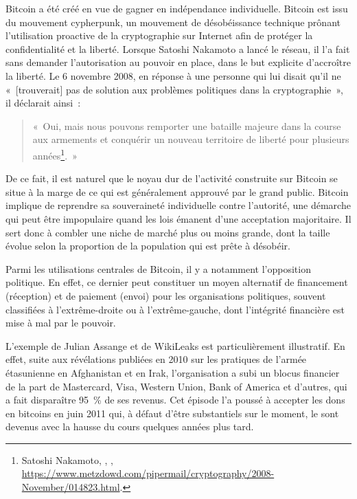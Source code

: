Bitcoin a été créé en vue de gagner en indépendance individuelle. Bitcoin est issu du mouvement cypherpunk, un mouvement de désobéissance technique prônant l'utilisation proactive de la cryptographie sur Internet afin de protéger la confidentialité et la liberté. Lorsque Satoshi Nakamoto a lancé le réseau, il l'a fait sans demander l'autorisation au pouvoir en place, dans le but explicite d'accroître la liberté. Le 6 novembre 2008, en réponse à une personne qui lui disait qu'il ne «~[trouverait] pas de solution aux problèmes politiques dans la cryptographie~», il déclarait ainsi~:

\begin{quote}
«~Oui, mais nous pouvons remporter une bataille majeure dans la course aux armements et conquérir un nouveau territoire de liberté pour plusieurs années\footnote{Satoshi Nakamoto, , , \url{https://www.metzdowd.com/pipermail/cryptography/2008-November/014823.html}.}.~»
\end{quote}

De ce fait, il est naturel que le noyau dur de l'activité construite sur Bitcoin se situe à la marge de ce qui est généralement approuvé par le grand public. Bitcoin implique de reprendre sa souveraineté individuelle contre l'autorité, une démarche qui peut être impopulaire quand les lois émanent d'une acceptation majoritaire. Il sert donc à combler une niche de marché plus ou moins grande, dont la taille évolue selon la proportion de la population qui est prête à désobéir.


Parmi les utilisations centrales de Bitcoin, il y a notamment l'opposition politique. En effet, ce dernier peut constituer un moyen alternatif de financement (réception) et de paiement (envoi) pour les organisations politiques, souvent classifiées à l'extrême-droite ou à l'extrême-gauche, dont l'intégrité financière est mise à mal par le pouvoir.

L'exemple de Julian Assange et de WikiLeaks est particulièrement illustratif. En effet, suite aux révélations publiées en 2010 sur les pratiques de l'armée étasunienne en Afghanistan et en Irak, l'organisation a subi un blocus financier de la part de Mastercard, Visa, Western Union, Bank of America et d'autres, qui a fait disparaître 95~\% de ses revenus. Cet épisode l'a poussé à accepter les dons en bitcoins en juin 2011 qui, à défaut d'être substantiels sur le moment, le sont devenus avec la hausse du cours quelques années plus tard.

